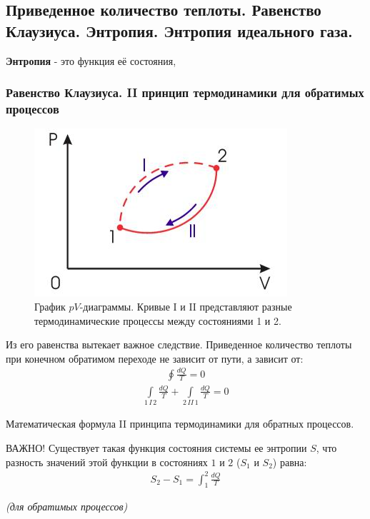 \subsection{Приведенное количество теплоты. Равенство Клаузиуса. Энтропия. Энтропия идеального газа.}

\textbf{Энтропия} - это функция её состояния,

\subsubsection*{Равенство Клаузиуса. II принцип термодинамики для обратимых процессов}
\begin{figure}[H]
	\centering
	\includegraphics[width=0.7\linewidth]{image/Rule}
	\caption{График $pV$-диаграммы.
		Кривые I и II представляют разные термодинамические процессы между состояниями 1 и 2.}
	\label{fig:9}
\end{figure}
Из его равенства вытекает важное следствие. Приведенное количество теплоты при конечном обратимом переходе не зависит от пути, а зависит от:
\begin{align} \label{34.1}
	\boxed{\oint \frac{dQ}{T} = 0}
\end{align}
\begin{align} \label{34.2}
	\int\limits_{1\,I\,2} \frac{dQ}{T} + \int\limits_{2\,II\,1} \frac{dQ}{T} = 0
\end{align}

Математическая формула II принципа термодинамики для обратных процессов.

\begin{tbox}{ВАЖНО!}
	Существует такая функция состояния системы ее энтропии $S$, что разность значений этой функции в состояниях $1$ и $2$ ($S_1$ и $S_2$) равна:
	\begin{align} \label{34.3}
		S_2 - S_1 = \int_{1}^{2}\frac{dQ}{T}
	\end{align}
	\begin{center}
		\textit{(для обратимых процессов)}
	\end{center}
\end{tbox}

